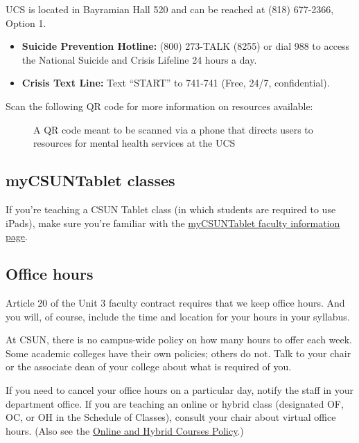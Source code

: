 \documentclass[
  letterpaper,
  DIV=11,
  numbers=noendperiod]{scrartcl}
\makeatletter
\providecommand{\tightlist}{%
  \setlength{\itemsep}{0pt}\setlength{\parskip}{0pt}}\usepackage{longtable,booktabs,array}
\newcommand*\pandocbounded[1]{%
  \sbox\pandoc@box{#1}%
  \Gscale@div\@tempa{\textheight}{\dimexpr\ht\pandoc@box+\dp\pandoc@box\relax}%
  \Gscale@div\@tempb{\linewidth}{\wd\pandoc@box}%
  \ifdim\@tempb\p@<\@tempa\p@\let\@tempa\@tempb\fi%
  \ifdim\@tempa\p@<\p@\scalebox{\@tempa}{\usebox\pandoc@box}%
  \else\usebox{\pandoc@box}%
  \fi%
}
\makeatother
\begin{document}
UCS is located in Bayramian Hall 520 and can be reached at (818)
677-2366, Option 1.

\begin{itemize}
\tightlist
\item
  \textbf{Suicide Prevention Hotline:} (800) 273-TALK (8255) or dial 988
  to access the National Suicide and Crisis Lifeline 24 hours a day.
\item
  \textbf{Crisis Text Line:} Text ``START'' to 741-741 (Free, 24/7,
  confidential).
\end{itemize}

Scan the following QR code for more information on resources available:

\begin{figure}[H]

{\centering \pandocbounded{\texttt{[image: \\\#.pdf]}}

}

\caption{A QR code meant to be scanned via a phone that directs users to
resources for mental health services at the UCS}

\end{figure}%

\subsection{myCSUNTablet classes}\label{mycsuntablet-classes}

If you're teaching a CSUN Tablet class (in which students are required
to use iPads), make sure you're familiar with the
\href{https://www.csun.edu}{myCSUNTablet faculty information page}.

\subsection{Office hours}\label{office-hours}

Article 20 of the Unit 3 faculty contract requires that we keep office
hours. And you will, of course, include the time and location for your
hours in your syllabus.

At CSUN, there is no campus-wide policy on how many hours to offer each
week. Some academic colleges have their own policies; others do not.
Talk to your chair or the associate dean of your college about what is
required of you.

If you need to cancel your office hours on a particular day, notify the
staff in your department office. If you are teaching an online or hybrid
class (designated OF, OC, or OH in the Schedule of Classes), consult
your chair about virtual office hours. (Also see the
\href{http://www.csun.edu/senate/policies/onlinehybridcourses.pdf}{Online
and Hybrid Courses Policy}.)
\end{document}
